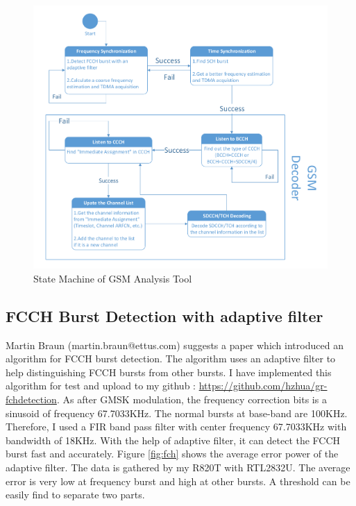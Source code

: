 \documentclass[a4paper,12pt,oneside]{article}
\begin{document}
\begin{figure}[!h]
\centering\includegraphics[width=6.4in]{figure/state_machine.pdf}
\caption{State Machine of GSM Analysis Tool \label{fig:3}}
\end{figure}


\subsection{FCCH Burst Detection with adaptive filter}
Martin Braun (martin.braun@ettus.com) suggests a paper \cite{1404796} which introduced an algorithm for FCCH burst detection. The algorithm uses an adaptive filter to help distinguishing FCCH bursts from other bursts. I have implemented this algorithm for test and upload to my github : {\color{blue}\url{https://github.com/hzhua/gr-fchdetection}}.
As after GMSK modulation, the frequency correction bits is a sinusoid of frequency 67.7033KHz. The normal bursts at base-band are 100KHz.
Therefore, I used a FIR band pass filter with center frequency 67.7033KHz with bandwidth of 18KHz. With the help of adaptive filter, it can detect
the FCCH burst fast and accurately. Figure \ref{fig:fch} shows the average error power of the adaptive filter. The data is gathered by my R820T with RTL2832U. The average error is very low
at frequency burst and high at other bursts. A threshold can be easily find to separate two parts.
\end{document}
